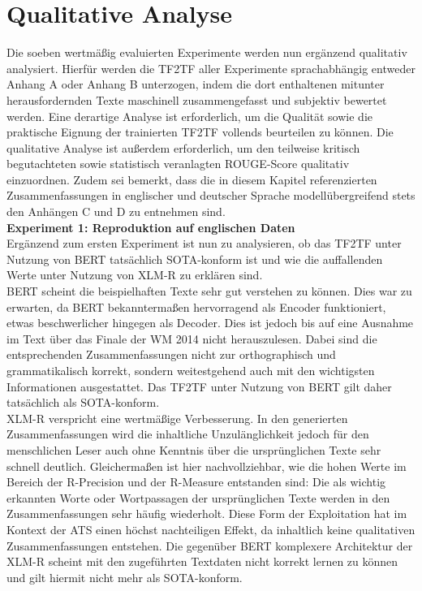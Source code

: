 \section{Qualitative Analyse}
\noindent
Die soeben wertmäßig evaluierten Experimente werden nun ergänzend qualitativ analysiert. Hierfür werden die \ac{TF2TF} aller Experimente sprachabhängig entweder Anhang A oder Anhang B unterzogen, indem die dort enthaltenen mitunter herausfordernden Texte maschinell zusammengefasst und subjektiv bewertet werden. Eine derartige Analyse ist erforderlich, um die Qualität sowie die praktische Eignung der trainierten \ac{TF2TF} vollends beurteilen zu können. Die qualitative Analyse ist außerdem erforderlich, um den teilweise kritisch begutachteten sowie statistisch veranlagten \ac{ROUGE}-Score qualitativ einzuordnen. Zudem sei bemerkt, dass die in diesem Kapitel referenzierten Zusammenfassungen in englischer und deutscher Sprache modellübergreifend stets den Anhängen C und D zu entnehmen sind.\\

\noindent
\textbf{Experiment 1: Reproduktion auf englischen Daten}\\
\noindent
Ergänzend zum ersten Experiment ist nun zu analysieren, ob das \ac{TF2TF} unter Nutzung von \ac{BERT} tatsächlich \ac{SOTA}-konform ist und wie die auffallenden Werte unter Nutzung von \ac{XLM-R} zu erklären sind.\\

\noindent
\ac{BERT} scheint die beispielhaften Texte sehr gut verstehen zu können. Dies war zu erwarten, da \ac{BERT} bekanntermaßen hervorragend als Encoder funktioniert, etwas beschwerlicher hingegen als Decoder. Dies ist jedoch bis auf eine Ausnahme im Text über das Finale der WM 2014 nicht herauszulesen. Dabei sind die entsprechenden Zusammenfassungen nicht zur orthographisch und grammatikalisch korrekt, sondern weitestgehend auch mit den wichtigsten Informationen ausgestattet. Das \ac{TF2TF} unter Nutzung von \ac{BERT} gilt daher tatsächlich als \ac{SOTA}-konform.\\

\noindent
\ac{XLM-R} verspricht eine wertmäßige Verbesserung. In den generierten Zusammenfassungen wird die inhaltliche Unzulänglichkeit jedoch für den menschlichen Leser auch ohne Kenntnis über die ursprünglichen Texte sehr schnell deutlich. Gleichermaßen ist hier nachvollziehbar, wie die hohen Werte im Bereich der R-Precision und der R-Measure entstanden sind: Die als wichtig erkannten Worte oder Wortpassagen der ursprünglichen Texte werden in den Zusammenfassungen sehr häufig wiederholt. Diese Form der Exploitation hat im Kontext der \ac{ATS} einen höchst nachteiligen Effekt, da inhaltlich keine qualitativen Zusammenfassungen entstehen. Die gegenüber \ac{BERT} komplexere Architektur der \ac{XLM-R} scheint mit den zugeführten Textdaten nicht korrekt lernen zu können und gilt hiermit nicht mehr als \ac{SOTA}-konform.
\newpage

